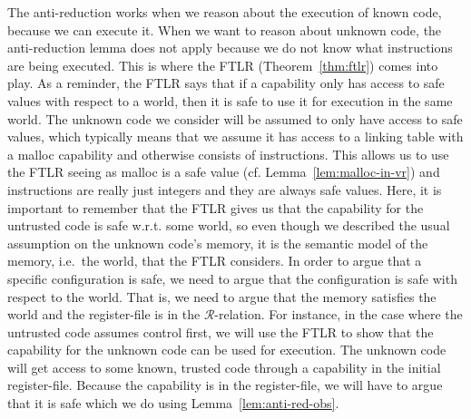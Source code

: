 \documentclass[format=acmsmall, review=true, screen=true]{acmart}
\newcommand{\asmType}{\plaindom{AsmType}}
\newcommand{\plaindom}[1]{\mathrm{#1}}
\newcommand{\intr}[2]{\mathcal{#1}}
\newcommand{\regintr}[1]{\intr{R}{#1}}
\newcommand{\stdrr}{\regintr{\asmType}}
\newenvironment{toplas}%
    {\color{OliveGreen}}{}
\begin{document}
\begin{toplas}
The anti-reduction works when we reason about the execution of known code,
because we can execute it. When we want to reason about unknown code, the
anti-reduction lemma does not apply because we do not know what instructions are
being executed. This is where the FTLR (Theorem~\ref{thm:ftlr}) comes into play.
As a reminder, the FTLR says that if a capability only has access to safe values
with respect to a world, then it is safe to use it for execution in the same
world. The unknown code we consider will be assumed to only have access to safe
values, which typically means that we assume it has access to a linking table
with a malloc capability and otherwise consists of instructions. This allows us
to use the FTLR seeing as malloc is a safe value (cf.
Lemma~\ref{lem:malloc-in-vr}) and instructions are really just integers and they
are always safe values. Here, it is important to remember that the FTLR gives us
that the capability for the untrusted code is safe w.r.t. some world, so even
though we described the usual assumption on the unknown code's memory, it is the
semantic model of the memory, i.e.\ the world, that the FTLR considers. In order
to argue that a specific configuration is safe, we need to argue that the
configuration is safe with respect to the world. That is, we need to argue that
the memory satisfies the world and the register-file is in the
$\stdrr$-relation. For instance, in the case where the untrusted code assumes
control first, we will use the FTLR to show that the capability for the unknown
code can be used for execution. The unknown code will get access to some known,
trusted code through a capability in the initial register-file. Because the
capability is in the register-file, we will have to argue that it is safe which
we do using Lemma~\ref{lem:anti-red-obs}.


\end{toplas}
\end{document}

